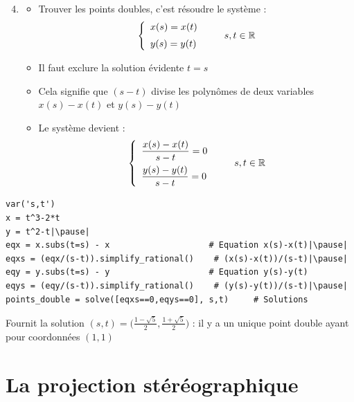 \begin{frame} 
 \begin{enumerate}
  \setcounter{enumi}{3}
  \item
  \begin{itemize}
    \item 
  Trouver les points doubles, c'est résoudre le système :
   $$\left\{
  \begin{array}{l}
  x(s) =  x(t)\\[2mm]
  y(s) =  y(t)
  \end{array}
  \right.\qquad  s,t \in \mathbb{R}$$ 
  \pause
    \item Il faut exclure la solution évidente $t=s$
   \pause 
    \item Cela signifie
  que $(s-t)$ divise les polynômes de deux variables $x(s)-x(t)$ et
  $y(s)-y(t)$
  \pause
    \item Le système devient :
   $$\left\{
  \begin{array}{l}
  \dfrac{x(s)-x(t)}{s-t} = 0  \\[3mm]
  \dfrac{y(s)-y(t)}{s-t} = 0
  \end{array}
  \right.\qquad  s,t \in \mathbb{R}$$   
  \end{itemize}

\end{enumerate}
\end{frame}


\begin{frame}[fragile]
\small
\begin{algo}
\begin{lstlisting} 
var('s,t')
x = t^3-2*t
y = t^2-t|\pause|
eqx = x.subs(t=s) - x                    # Equation x(s)-x(t)|\pause|
eqxs = (eqx/(s-t)).simplify_rational()    # (x(s)-x(t))/(s-t)|\pause|
eqy = y.subs(t=s) - y                    # Equation y(s)-y(t)
eqys = (eqy/(s-t)).simplify_rational()    # (y(s)-y(t))/(s-t)|\pause|
points_double = solve([eqxs==0,eqys==0], s,t)     # Solutions
\end{lstlisting}
\end{algo}  

\bigskip
\pause

Fournit la solution 
  $(s,t) = \big(\frac{1-\sqrt5}{2}, \frac{1+\sqrt5}{2}\big)$ : il y a un unique 
  point double ayant pour coordonnées $(1,1)$
\end{frame}


\section{La projection stéréographique}

